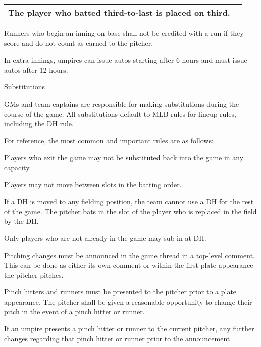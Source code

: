 \begin{deepEnumerate}
\begin{deepEnumerate}
\begin{center}
\begin{longtable}{|p{3cm}|p{8cm}|}
				The player who batted third-to-last is placed on third. \\
				\hline
			\end{longtable}
		\end{center}
		\item Runners who begin an inning on base shall not be credited with a run if they score and
		do not count as earned to the pitcher.
		\item In extra innings, umpires can issue autos starting after 6 hours and must issue autos after 12 hours.
	\end{deepEnumerate}
	\item Substitutions
	\label{sec:substitutions}
	\begin{deepEnumerate}
		\item GMs and team captains are responsible for making substitutions during the course of the game.
		All substitutions default to MLB rules for lineup rules, including the DH rule.
		\begin{deepEnumerate}
			\item For reference, the most common and important rules are as follows:
			\begin{deepEnumerate}
				\item Players who exit the game may not be substituted back into the game in any capacity.
				\item Players may not move between slots in the batting order.
				\item If a DH is moved to any fielding position, the team cannot use a DH for the rest of the game. 
				The pitcher bats in the slot of the player who is replaced in the field by the DH.
				\item Only players who are not already in the game may sub in at DH.
			\end{deepEnumerate}
		\end{deepEnumerate}
		\item Pitching changes must be announced in the game thread in a top-level comment.  
		This can be done as either its own comment or within the first plate appearance the pitcher pitches.
		\item Pinch hitters and runners must be presented to the pitcher prior to a plate appearance. 
		The pitcher shall be given a reasonable opportunity to change their pitch in the event of a pinch hitter or runner.
		\begin{deepEnumerate}
			\item If an umpire presents a pinch hitter or runner to the current pitcher, any further changes regarding that pinch hitter or runner prior to the announcement 

\end{deepEnumerate}
\end{deepEnumerate}
\end{deepEnumerate}
